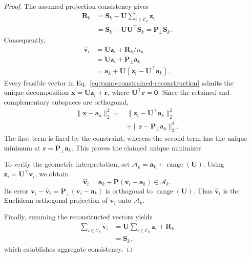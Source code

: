 \begin{proof}
The assumed projection consistency gives
\begin{equation*}
\begin{aligned}
    \mathbf{R}_k
    &=\mathbf{S}_k-
      \mathbf{U}\sum_{i\in\mathcal{C}_k}\mathbf{z}_i\\
    &=\mathbf{S}_k-\mathbf{U}\mathbf{U}^{\top}\mathbf{S}_k
      =\mathbf{P}_{\perp}\mathbf{S}_k.
\end{aligned}
\end{equation*}
Consequently,
\begin{equation*}
\begin{aligned}
    \hat{\mathbf{v}}_i
    &=\mathbf{U}\mathbf{z}_i+\mathbf{R}_k/n_k\\
    &=\mathbf{U}\mathbf{z}_i+\mathbf{P}_{\perp}\mathbf{a}_k\\
    &=\mathbf{a}_k+
      \mathbf{U}(\mathbf{z}_i-\mathbf{U}^{\top}\mathbf{a}_k).
\end{aligned}
\end{equation*}
Every feasible vector in
Eq.~\eqref{eq:vamo-constrained-reconstruction} admits the unique
decomposition
$\mathbf{x}=\mathbf{U}\mathbf{z}_i+\mathbf{r}$,
where $\mathbf{U}^{\top}\mathbf{r}=\mathbf{0}$.
Since the retained and complementary subspaces are orthogonal,
\begin{equation*}
\begin{aligned}
    \|\mathbf{x}-\mathbf{a}_k\|_2^2
    ={}&
    \|\mathbf{z}_i-\mathbf{U}^{\top}\mathbf{a}_k\|_2^2\\
    &+\|\mathbf{r}-\mathbf{P}_{\perp}\mathbf{a}_k\|_2^2.
\end{aligned}
\end{equation*}
The first term is fixed by the constraint, whereas the second term
has the unique minimum at
$\mathbf{r}=\mathbf{P}_{\perp}\mathbf{a}_k$.
This proves the claimed unique minimizer.

To verify the geometric interpretation, set
$\mathcal{A}_k
=\mathbf{a}_k+\operatorname{range}(\mathbf{U})$.
Using $\mathbf{z}_i=\mathbf{U}^{\top}\mathbf{v}_i$, we obtain
\begin{equation*}
    \hat{\mathbf{v}}_i
    =\mathbf{a}_k+\mathbf{P}(\mathbf{v}_i-\mathbf{a}_k)
    \in\mathcal{A}_k.
\end{equation*}
Its error
$\mathbf{v}_i-\hat{\mathbf{v}}_i
=\mathbf{P}_{\perp}(\mathbf{v}_i-\mathbf{a}_k)$
is orthogonal to $\operatorname{range}(\mathbf{U})$.
Thus $\hat{\mathbf{v}}_i$ is the Euclidean orthogonal projection
of $\mathbf{v}_i$ onto $\mathcal{A}_k$.

Finally, summing the reconstructed vectors yields
\begin{equation*}
\begin{aligned}
    \sum_{i\in\mathcal{C}_k}\hat{\mathbf{v}}_i
    &=\mathbf{U}\sum_{i\in\mathcal{C}_k}\mathbf{z}_i
      +\mathbf{R}_k\\
    &=\mathbf{S}_k,
\end{aligned}
\end{equation*}
which establishes aggregate consistency.
\end{proof}

